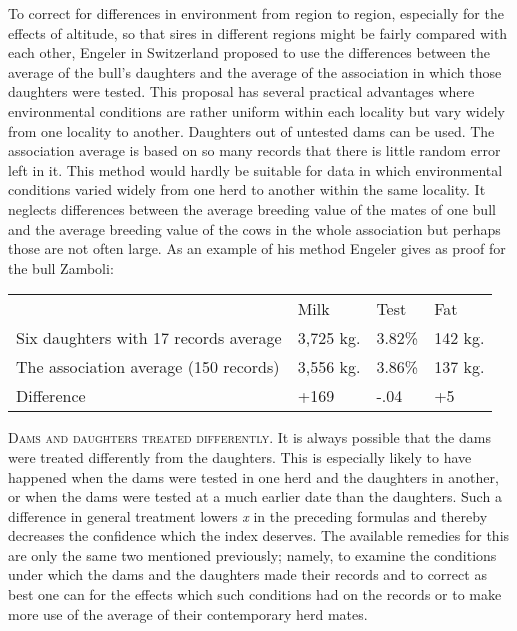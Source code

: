 To correct for differences in environment from region to region,
especially for the effects of altitude, so that sires in different regions
might be fairly compared with each other, Engeler in Switzerland proposed
to use the differences between the average of the bull's daughters
and the average of the association in which those daughters were tested.
This proposal has several practical advantages where environmental
conditions are rather uniform within each locality but vary widely
from one locality to another. Daughters out of untested dams can be
used. The association average is based on so many records that there is
little random error left in it. This method would hardly be suitable for
data in which environmental conditions varied widely from one herd to
another within the same locality. It neglects differences between the
average breeding value of the mates of one bull and the average breeding
value of the cows in the whole association but perhaps those are
not often large. As an example of his method Engeler gives as proof for
the bull Zamboli:

\begin{table}[h]
	\centering
	\begin{tabular}{L{6cm}C{1.5cm}C{1.5cm}C{1.5cm}}
	~										& Milk		& Test		& Fat		\\
	Six daughters with 17 records average	& 3,725 kg.	& 3.82\%	& 142 kg.	\\
	The association average (150 records)	& 3,556 kg.	& 3.86\%	& 137 kg.	\\
	\hspace{1em}Difference					& +169		& -.04		& +5
	\end{tabular}
\end{table}

\textsc{Dams and daughters treated differently}. It is always possible
that the dams were treated differently from the daughters. This is
especially likely to have happened when the dams were tested in one
herd and the daughters in another, or when the dams were tested at
a much earlier date than the daughters. Such a difference in general
treatment lowers \textit{x} in the preceding formulas and thereby decreases
the confidence which the index deserves. The available remedies for
this are only the same two mentioned previously; namely, to examine
the conditions under which the dams and the daughters made their
records and to correct as best one can for the effects which such conditions
had on the records or to make more use of the average of their
contemporary herd mates.


